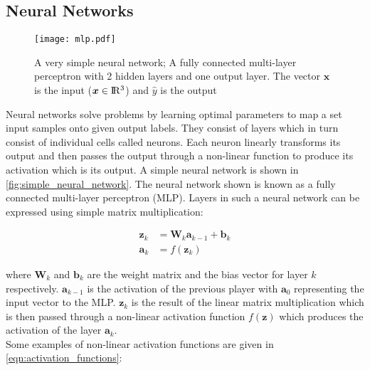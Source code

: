 \subsection{Neural Networks}

    \begin{figure}[H]
        \centering
        \texttt{[image: mlp.pdf]}
        \caption{A very simple neural network; A fully connected multi-layer perceptron with 2 hidden layers and one output layer. The vector $\boldsymbol{x}$ is the input ($\boldsymbol{x} \in \rm I\!R^{3}$) and $\hat{y}$ is the output}
        \label{fig:simple_neural_network}
    \end{figure}
        
    Neural networks solve problems by learning optimal parameters to map a set input samples onto given output labels. They consist of layers which in turn consist of individual cells called neurons. Each neuron linearly transforms its output and then passes the output through a non-linear function to produce its activation which is its output. A simple neural network is shown in \autoref{fig:simple_neural_network}. The neural network shown is known as a fully connected multi-layer perceptron (MLP). Layers in such a neural network can be expressed using simple matrix multiplication:
    
    \begin{equation}
        \begin{split}
            \boldsymbol{z}_k &= \boldsymbol{W}_k \boldsymbol{a}_{k-1} + \boldsymbol{b}_k \\
            \boldsymbol{a}_k &= f\left(\boldsymbol{z}_k\right)
        \end{split}
    \end{equation}
    
    where $\boldsymbol{W}_k$ and $\boldsymbol{b}_k$ are the weight matrix and the bias vector for layer $k$ respectively. $\boldsymbol{a}_{k-1}$ is the activation of the previous player with $\boldsymbol{a}_{0}$ representing the input vector to the MLP. $\boldsymbol{z}_k$ is the result of the linear matrix multiplication which is then passed through a non-linear activation function $f\left(\boldsymbol{z}\right)$ which produces the activation of the layer $\boldsymbol{a}_{k}$.
    \\
    
    Some examples of non-linear activation functions are given in \autoref{eqn:activation_functions}:
    
